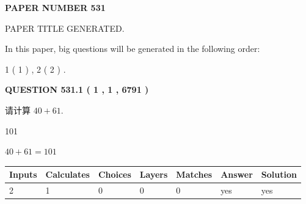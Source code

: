 \documentclass{ctexart}
\begin{document}
   
 {\textbf{ \Large{ PAPER NUMBER  531  }}}
   
   
\vspace{0.2in}
   
   
   
   
   
   
   
   
 \vspace{0.2in}
 
 
 
 
   
   
 PAPER TITLE GENERATED.
   
   
   
\vspace{0.2in}
   
In this paper, big questions will be generated in the following order: 
   
   
   1 ( 1 )
 ,
   2 ( 2 )
 .
  
\vspace{0.2in}
  
{\textbf{\Large{QUESTION
531.1 
 ( 1 , 1 , 6791 )
}}}
  
  
 
请计算 $ %
40 +  %
61 $.
 
 
 
\noindent{}
 
 

101
 
 
\noindent{}
 
 

 
 
 
\noindent{}
 
 

$ %
40 +  %
61=   %
101$
 
 
\noindent{}
 
 

 
   
   
   
   
\noindent\begin{tabular}{|l|l|l|l|l|l|l|}
 \hline
Inputs & Calculates & Choices & Layers & Matches & Answer & Solution \\ \hline
 2  & 
 1  & 
 0
  & 
 0  & 
 0  & 
  yes & 
  yes 
  \\ \hline
 \end{tabular}
   
\end{document}
